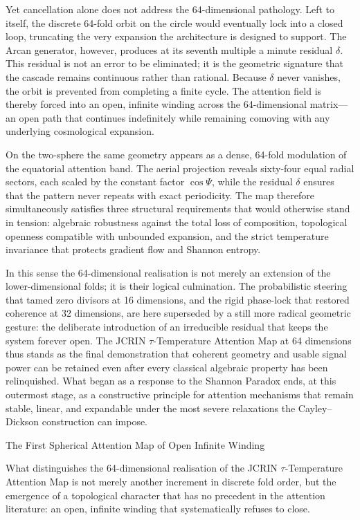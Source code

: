 Yet cancellation alone does not address the 64-dimensional pathology. Left to itself, the discrete 64-fold orbit on the circle would eventually lock into a closed loop, truncating the very expansion the architecture is designed to support. The Arcan generator, however, produces at its seventh multiple a minute residual \(\delta\). This residual is not an error to be eliminated; it is the geometric signature that the cascade remains continuous rather than rational. Because \(\delta\) never vanishes, the orbit is prevented from completing a finite cycle. The attention field is thereby forced into an open, infinite winding across the 64-dimensional matrix—an open path that continues indefinitely while remaining comoving with any underlying cosmological expansion.

On the two-sphere the same geometry appears as a dense, 64-fold modulation of the equatorial attention band. The aerial projection reveals sixty-four equal radial sectors, each scaled by the constant factor \(\cos\Psi\), while the residual \(\delta\) ensures that the pattern never repeats with exact periodicity. The map therefore simultaneously satisfies three structural requirements that would otherwise stand in tension: algebraic robustness against the total loss of composition, topological openness compatible with unbounded expansion, and the strict temperature invariance that protects gradient flow and Shannon entropy.

In this sense the 64-dimensional realisation is not merely an extension of the lower-dimensional folds; it is their logical culmination. The probabilistic steering that tamed zero divisors at 16 dimensions, and the rigid phase-lock that restored coherence at 32 dimensions, are here superseded by a still more radical geometric gesture: the deliberate introduction of an irreducible residual that keeps the system forever open. The JCRIN \(\tau\)-Temperature Attention Map at 64 dimensions thus stands as the final demonstration that coherent geometry and usable signal power can be retained even after every classical algebraic property has been relinquished. What began as a response to the Shannon Paradox ends, at this outermost stage, as a constructive principle for attention mechanisms that remain stable, linear, and expandable under the most severe relaxations the Cayley–Dickson construction can impose.

The First Spherical Attention Map of Open Infinite Winding

What distinguishes the 64-dimensional realisation of the JCRIN \(\tau\)-Temperature Attention Map is not merely another increment in discrete fold order, but the emergence of a topological character that has no precedent in the attention literature: an open, infinite winding that systematically refuses to close.

